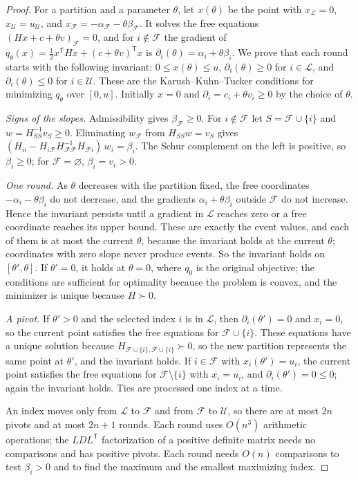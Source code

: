 \begin{proof}
For a partition and a parameter $\theta$, let $x(\theta)$ be the point with
$x_{\mathcal L}=0$, $x_{\mathcal U}=u_{\mathcal U}$, and
$x_{\mathcal F}=-\alpha_{\mathcal F}-\theta\beta_{\mathcal F}$. It solves the
free equations $(Hx+c+\theta v)_{\mathcal F}=0$, and for $i\notin\mathcal F$
the gradient of $q_\theta(x)=\frac12x^{\mathsf T}Hx+(c+\theta v)^{\mathsf T}x$
is $\partial_i(\theta)=\alpha_i+\theta\beta_i$. We prove that each round
starts with the following invariant: $0\le x(\theta)\le u$,
$\partial_i(\theta)\ge0$ for $i\in\mathcal L$, and $\partial_i(\theta)\le0$ for
$i\in\mathcal U$. These are the Karush--Kuhn--Tucker conditions for
minimizing $q_\theta$ over $[0,u]$. Initially $x=0$ and
$\partial_i=c_i+\theta v_i\ge0$ by the choice of $\theta$.

\emph{Signs of the slopes.} Admissibility gives $\beta_{\mathcal F}\ge0$. For
$i\notin\mathcal F$ let $S=\mathcal F\cup\{i\}$ and $w=H_{SS}^{-1}v_S\ge0$.
Eliminating $w_{\mathcal F}$ from $H_{SS}w=v_S$ gives
$(H_{ii}-H_{i\mathcal F}H_{\mathcal F\mathcal F}^{-1}H_{\mathcal Fi})\,w_i=\beta_i$.
The Schur complement on the left is positive, so $\beta_i\ge0$; for
$\mathcal F=\varnothing$, $\beta_i=v_i>0$.

\emph{One round.} As $\theta$ decreases with the partition fixed, the free
coordinates $-\alpha_i-\theta\beta_i$ do not decrease, and the gradients
$\alpha_i+\theta\beta_i$ outside $\mathcal F$ do not increase. Hence the
invariant persists until a gradient in $\mathcal L$ reaches zero or a free
coordinate reaches its upper bound. These are exactly the event values, and
each of them is at most the current $\theta$, because the invariant holds at
the current $\theta$; coordinates with zero slope never produce events. So the
invariant holds on $[\theta',\theta]$. If $\theta'=0$, it holds at $\theta=0$,
where $q_0$ is the original objective; the conditions are sufficient for
optimality because the problem is convex, and the minimizer is unique because
$H\succ0$.

\emph{A pivot.} If $\theta'>0$ and the selected index $i$ is in $\mathcal L$,
then $\partial_i(\theta')=0$ and $x_i=0$, so the current point satisfies the
free equations for $\mathcal F\cup\{i\}$. These equations have a unique
solution because $H_{\mathcal F\cup\{i\},\mathcal F\cup\{i\}}\succ0$, so the
new partition represents the same point at $\theta'$, and the invariant holds.
If $i\in\mathcal F$ with $x_i(\theta')=u_i$, the current point satisfies the
free equations for $\mathcal F\setminus\{i\}$ with $x_i=u_i$, and
$\partial_i(\theta')=0\le0$; again the invariant holds. Ties are processed one
index at a time.

An index moves only from $\mathcal L$ to $\mathcal F$ and from $\mathcal F$ to
$\mathcal U$, so there are at most $2n$ pivots and at most $2n+1$ rounds. Each
round uses $O(n^3)$ arithmetic operations; the $LDL^{\mathsf T}$ factorization
of a positive definite matrix needs no comparisons and has positive pivots.
Each round needs $O(n)$ comparisons to test $\beta_i>0$ and to find the
maximum and the smallest maximizing index.
\end{proof}

